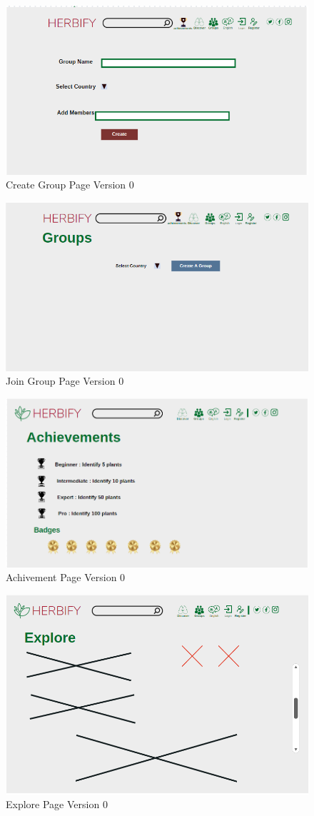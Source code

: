 \documentclass[conference]{IEEEtran}
\begin{document}
\begin{figure}[H]
\centerline{\includegraphics[width=0.48 \textwidth]{images/creategroupv0.png}}
\caption{Create Group Page Version 0}
\label{fig:graph1}
\end{figure}


\begin{figure}[H]
\centerline{\includegraphics[width=0.48 \textwidth]{images/joingroupv0.png}}
\caption{Join Group Page Version 0}
\label{fig:graph1}
\end{figure}



\begin{figure}[H]
\centerline{\includegraphics[width=0.48 \textwidth]{images/achivementsV0.png}}
\caption{Achivement Page Version 0}
\label{fig:graph1}
\end{figure}


\begin{figure}[H]
\centerline{\includegraphics[width=0.48 \textwidth]{images/exploreV0.png}}
\caption{Explore Page Version 0}
\label{fig:graph1}
\end{figure}
\end{document}
